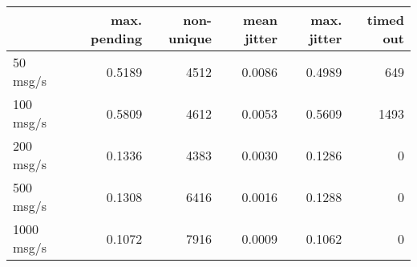 \begin{tabular}{l|rrrrr}
\rowcolor{gray!50}
 & max. pending & non-unique & mean jitter & max. jitter & timed out\\\hline
50 msg/s & 0.5189 & 4512 & 0.0086 & 0.4989 & 649 \\
100 msg/s & 0.5809 & 4612 & 0.0053 & 0.5609 & 1493 \\
200 msg/s & 0.1336 & 4383 & 0.0030 & 0.1286 & 0 \\
500 msg/s & 0.1308 & 6416 & 0.0016 & 0.1288 & 0 \\
1000 msg/s & 0.1072 & 7916 & 0.0009 & 0.1062 & 0 \\
\end{tabular}
